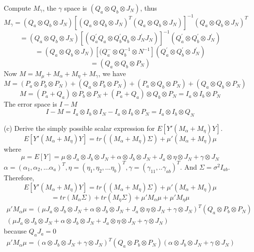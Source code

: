 \documentclass{homework}
\begin{document}
\begin{itemize}
    Compute $M_\gamma$, the $\gamma$ space is $(Q_a \otimes Q_b \otimes J_N)$, thus
     \[ 
    M_\gamma = (Q_a \otimes Q_b \otimes J_N) [(Q_a \otimes Q_b \otimes J_N)^{T}(Q_a \otimes Q_b \otimes J_N)]^{-1} (Q_a \otimes Q_b \otimes J_N)^{T}
    \] 
    \[ 
     = (Q_a \otimes Q_b \otimes J_N) [(Q_a ^{'}Q_a\otimes Q_b^{'}Q_b \otimes J_N^{'}J_N)]^{-1}(Q_a^{'} \otimes Q_b^{'} \otimes J_N^{'})
    \]
    \[ 
     = (Q_a \otimes Q_b \otimes J_N) [(Q_a^{-}\otimes Q_b^{-1} \otimes N^{-1}](Q_a^{'} \otimes Q_b^{'} \otimes J_N^{'})
    \] 
    \[ 
     = (Q_a \otimes Q_b \otimes P_N) 
    \]
    Now $M = M_{\mu} + M_{\alpha} + M_{\eta} + M_{\gamma}$, we have
    \[ 
     M =(P_a \otimes P_b \otimes P_N) + (Q_a \otimes P_b \otimes P_N) + (P_a \otimes Q_b \otimes P_N)  + (Q_a \otimes Q_b \otimes P_N) 
    \]  
    \[ 
     M =(P_a + Q_a) \otimes P_b \otimes P_N + (P_a + Q_a) \otimes Q_b \otimes P_N  = I_a \otimes I_b \otimes P_N
    \]
    The error space is $I-M$
    \[ 
     I-M = I_a \otimes I_b \otimes I_N - I_a \otimes I_b \otimes P_N = I_a \otimes I_b \otimes Q_N
    \] 
    \item[(c)] Derive the simply possible scalar expression for $E[Y'(M_\alpha + M_\eta)Y]$.\\
    \[ 
     E[Y'(M_\alpha + M_\eta)Y] = tr((M_\alpha + M_\eta)\Sigma) + \mu'(M_\alpha + M_\eta)\mu
    \]
    where
    \[ 
     \mu = E[Y] = \mu \otimes J_a \otimes J_b \otimes J_N + \alpha \otimes J_b \otimes J_N + J_a \otimes \eta \otimes J_N + \gamma \otimes J_N
    \] 
    $\alpha = (\alpha_1, \alpha_2,... \alpha_a)^T, \eta = (\eta_1, \eta_2,... \eta_b)^T, \gamma= (\gamma_{11},.. \gamma_{ab})^T$. And $\Sigma = \sigma^2 I_{ab}$.\\
    Therefore, 
    \[ 
     E[Y'(M_\alpha + M_\eta)Y] = tr((M_\alpha + M_\eta)\Sigma) + \mu'(M_\alpha + M_\eta)\mu 
    \]
    \[ 
     = tr(M_\alpha \Sigma) + tr(M_\eta\Sigma) + \mu'M_\alpha \mu + \mu' M_\eta \mu 
    \]    
    \[ 
    \begin{split}
     \mu'M_\alpha \mu = (\mu J_a \otimes J_b \otimes J_N + \alpha \otimes J_b \otimes J_N + J_a 
     \otimes \eta \otimes J_N + \gamma \otimes J_N)^T (Q_a \otimes P_b \otimes P_N)\\
     (\mu J_a \otimes J_b \otimes J_N + \alpha \otimes J_b \otimes J_N 
     + J_a \otimes \eta \otimes J_N + \gamma \otimes J_N)   
    \end{split}
    \] 
    because $Q_a J_a = 0$
    \[ 
    \begin{split}
     \mu'M_\alpha \mu = (\alpha \otimes J_b \otimes J_N + \gamma \otimes J_N)^T (Q_a \otimes P_b \otimes P_N)     (\alpha \otimes J_b \otimes J_N + \gamma \otimes J_N)  \\ 

\end{split}\]
\end{itemize}
\end{document}
